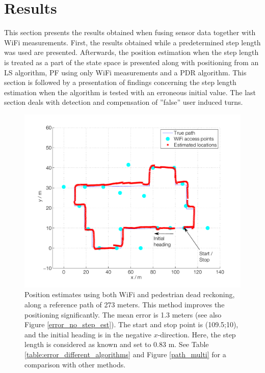 \documentclass{LTHthesis}
\begin{document}
\section{Results}
%
This section presents the results obtained when fusing sensor data together with WiFi measurements. First, the results obtained while a predetermined step length was used are presented. Afterwards, the position estimation when the step length is treated as a part of the state space is presented along with positioning from an LS algorithm, PF using only WiFi measurements and a PDR algorithm. This section is followed by a presentation of findings concerning the step length estimation when the algorithm is tested with an erroneous initial value. The last section deals with detection and compensation of ''false'' user induced turns.   
%
\begin{figure}[!hbt]

\includegraphics[width=1\textwidth ]{images/sensor_fused/path_no_step_est.pdf}
\caption{Position estimates using both WiFi and pedestrian dead reckoning, along a reference path of 273 meters. This method improves the positioning significantly. The mean error is 1.3 meters (see also Figure \ref{error_no_step_est}). The start and stop point is (109.5;10), and the initial heading is in the negative $x$-direction. Here, the step length is considered as known and set to 0.83 m. See Table \ref{table:error_different_algorithms} and Figure \ref{path_multi} for a comparison with other methods.}\label{path_no_step_est}
\end{figure}
%
\end{document}
